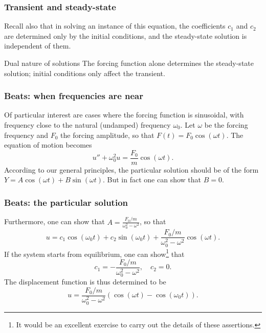 \begin{frame}

\frametitle{Transient and steady-state}
\label{transientandsteady-state}

Recall also that in solving an instance of this equation, the coefficients $ c_1 $ and $ c_2 $ are determined only by the initial conditions, and the steady-state solution is independent of them.

 
\begin{block}{Dual nature of solutions}
    The forcing function alone determines the steady-state solution; initial conditions only affect the transient.
\end{block}
 

\end{frame}

\begin{frame}

\frametitle{Beats: when frequencies are near}
\label{beats:whenfrequenciesarenear}

Of particular interest are cases where the forcing function is sinusoidal, with frequency close to the natural (undamped) frequency $ \omega_0 $. Let $ \omega $ be the forcing frequency and $ F_0 $ the forcing amplitude, so that $ F(t) = F_0 \cos{(\omega t)} $. The equation of motion becomes
\[
    u'' + \omega_0^2 u = \frac{F_0}{m} \cos{(\omega t)}.
\]
According to our general principles, the particular solution should be of the form $ Y = A \cos{(\omega t)} + B \sin{(\omega t)} $. But in fact one can show that $ B = 0 $.

\end{frame}

\begin{frame}

\frametitle{Beats: the particular solution}
\label{beats:theparticularsolution}

Furthermore, one can show that $ A = \frac{F_0/m}{\omega_0^2 - \omega^2} $, so that
\[
    u = c_1 \cos{(\omega_0 t)} + c_2 \sin{(\omega_0 t)} + \frac{F_0/m}{\omega_0^2 - \omega^2} \cos{(\omega t)}.
\]
If the system starts from equilibrium, one can show\footnote{It would be an excellent exercise to carry out the details of these assertions.} that
\[
    c_1 = -\frac{F_0/m}{\omega_0^2 - \omega^2}, \quad c_2 = 0.
\]
The displacement function is thus determined to be
\[
    u = \frac{F_0/m}{\omega_0^2 - \omega^2} \left( \cos{(\omega t)} - \cos{(\omega_0 t)} \right).
\]

\end{frame}

